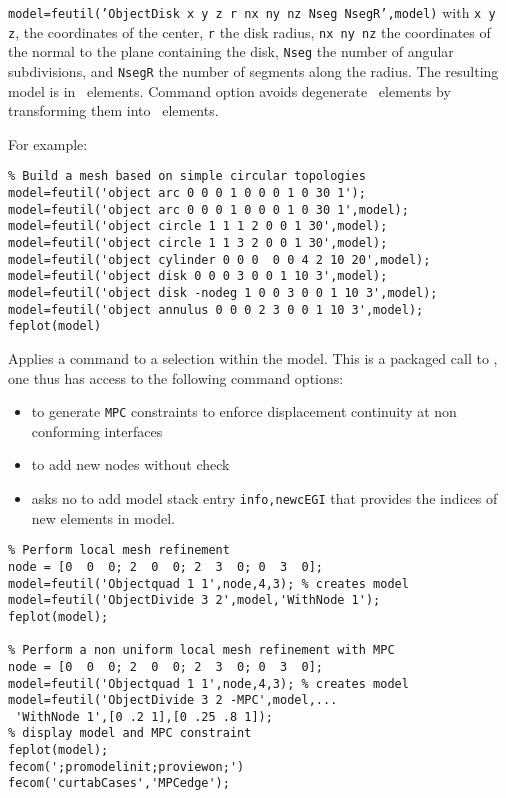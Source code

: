 {\tt model=feutil('ObjectDisk x y z r nx ny nz Nseg NsegR',model)}
with {\tt x y z}, the coordinates of the center, {\tt r} the disk radius, {\tt nx ny nz} the coordinates of the normal to the plane containing the disk, {\tt Nseg} the number of angular subdivisions, and {\tt NsegR} the number of segments along the radius. The resulting model is in \quada\ elements. Command option  avoids degenerate \quad\ elements by transforming them into \triaa\ elements.

For example:
\begin{verbatim}
% Build a mesh based on simple circular topologies
model=feutil('object arc 0 0 0 1 0 0 0 1 0 30 1');
model=feutil('object arc 0 0 0 1 0 0 0 1 0 30 1',model);
model=feutil('object circle 1 1 1 2 0 0 1 30',model);
model=feutil('object circle 1 1 3 2 0 0 1 30',model);
model=feutil('object cylinder 0 0 0  0 0 4 2 10 20',model);
model=feutil('object disk 0 0 0 3 0 0 1 10 3',model);
model=feutil('object disk -nodeg 1 0 0 3 0 0 1 10 3',model);
model=feutil('object annulus 0 0 0 2 3 0 0 1 10 3',model);
feplot(model)
\end{verbatim}%



Applies a  command to a selection within the model. This is a packaged call to , one thus has access to the following command options:
\begin{itemize}
\item {} to generate {\tt MPC} constraints to enforce displacement continuity at non conforming interfaces
\item {} to add new nodes without check
\item {} asks no to add model stack entry {\tt info,newcEGI} that provides the indices of new elements in model.
\end{itemize}

\begin{verbatim}
% Perform local mesh refinement
node = [0  0  0; 2  0  0; 2  3  0; 0  3  0];
model=feutil('Objectquad 1 1',node,4,3); % creates model 
model=feutil('ObjectDivide 3 2',model,'WithNode 1');
feplot(model);

% Perform a non uniform local mesh refinement with MPC
node = [0  0  0; 2  0  0; 2  3  0; 0  3  0];
model=feutil('Objectquad 1 1',node,4,3); % creates model 
model=feutil('ObjectDivide 3 2 -MPC',model,...
 'WithNode 1',[0 .2 1],[0 .25 .8 1]);
% display model and MPC constraint
feplot(model);
fecom(';promodelinit;proviewon;')
fecom('curtabCases','MPCedge');
\end{verbatim}%


